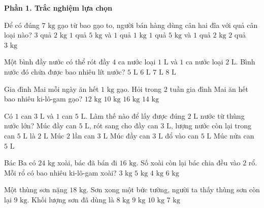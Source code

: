 \textbf{Phần 1. Trắc nghiệm lựa chọn}

\begin{ex} %
Để có đúng $7\text{ kg}$ gạo từ bao gạo to, người bán hàng dùng cân hai đĩa với quả cân loại nào?
\choice
{$3$ quả $2\text{ kg}$}
{$1$ quả $5\text{ kg}$ và $1$ quả $1\text{ kg}$}
{\True $1$ quả $5\text{ kg}$ và $1$ quả $2\text{ kg}$}
{$2$ quả $3\text{ kg}$}
\end{ex}

\begin{ex} %
Một bình đầy nước có thể rót đầy $4$ ca nước loại $1\text{ L}$ và $1$ ca nước loại $2\text{ L}$. Bình nước đó chứa được bao nhiêu lít nước?
\choice
{$5\text{ L}$}
{\True $6\text{ L}$}
{$7\text{ L}$}
{$8\text{ L}$}
\end{ex}

\begin{ex} %
Gia đình Mai mỗi ngày ăn hết $1\text{ kg}$ gạo. Hỏi trong $2$ tuần gia đình Mai ăn hết bao nhiêu ki-lô-gam gạo?
\choice
{$12\text{ kg}$}
{$10\text{ kg}$}
{$16\text{ kg}$}
{\True $14\text{ kg}$}
\end{ex}

\begin{ex} %
Có $1$ can $3\text{ L}$ và $1$ can $5\text{ L}$. Làm thế nào để lấy được đúng $2\text{ L}$ nước từ thùng nước lớn?
\choice
{\True Múc đầy can $5\text{ L}$, rót sang cho đầy can $3\text{ L}$, lượng nước còn lại trong can $5\text{ L}$ là $2\text{ L}$}
{Múc $2$ lần can $3\text{ L}$}
{Múc đầy can $3\text{ L}$ đổ vào can $5\text{ L}$}
{Múc nửa can $5\text{ L}$}
\end{ex}

\begin{ex} %
Bác Ba có $24\text{ kg}$ xoài, bác đã bán đi $16\text{ kg}$. Số xoài còn lại bác chia đều vào $2$ rổ. Mỗi rổ có bao nhiêu ki-lô-gam xoài?
\choice
{$3\text{ kg}$}
{$5\text{ kg}$}
{\True $4\text{ kg}$}
{$6\text{ kg}$}
\end{ex}

\begin{ex} %
Một thùng sơn nặng $18\text{ kg}$. Sơn xong một bức tường, người ta thấy thùng sơn còn lại $9\text{ kg}$. Khối lượng sơn đã dùng là
\choice
{$8\text{ kg}$}
{\True $9\text{ kg}$}
{$10\text{ kg}$}
{$7\text{ kg}$}
\end{ex}

